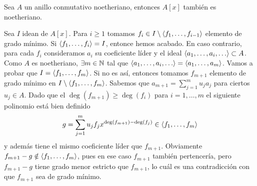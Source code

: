 \documentclass[twoside]{report}
\begin{document}
\begin{teorema} Sea $A$ un anillo conmutativo noetheriano, entonces $A[x]$ también es noetheriano.
\end{teorema}
\begin{dem}
Sea $I$ idean de $A[x]$. Para $i\geq 1$ tomamos $f_i \in I\setminus \langle{f_1,\dotsc,f_{i-1}}\rangle$ elemento de grado mínimo. Si $\langle{f_1,\dotsc,f_i}\rangle = I$, entonce hemos acabado. En caso contrario, para cada $f_i$ consideramos $a_i$ su coeficiente líder y el ideal $\langle{a_1,\dotsc,a_i,\dotsc}\rangle\subset A$. Como $A$ es noetheriano, $\exists m\in \mathbb{N}$ tal que $\langle{a_1,\dotsc,a_i,\dotsc}\rangle=\langle{a_1,\dotsc,a_m}\rangle$. Vamos a probar que $I=\langle{f_1,\dotsc,f_m}\rangle$. Si no es así, entonces tomamos $f_{m+1}$ elemento de grado mínimo en $ I\setminus \langle{f_1,\dotsc,f_{m}}\rangle$. Sabemos que $a_{m+1}=\sum_{j=1}^m u_j a_j$ para ciertos $u_j\in A$. Dado que el $\deg(f_{m+1})\geq \deg(f_i)$ para $i=1,\dotsc,m$ el siguiente polinomio está bien definido
$$
g = \sum_{j=1}^m u_jf_jx^{\deg(f_{m+1})-\deg(f_j)} \in \langle{f_1,\dotsc,f_m}\rangle
$$
y además tiene el mismo coeficiente líder que $f_{m+1}$.  Obviamente $f_{m+1}-g \notin \langle{f_1,\dotsc,f_m}\rangle$, pues en ese caso $f_{m+1}$ también pertencería, pero $f_{m+1}-g$ tiene grado menor estricto que $f_{m+1}$, lo cuál es una contradicción con que $f_{m+1}$ sea de grado mínimo.
\end{dem}
\end{document}
